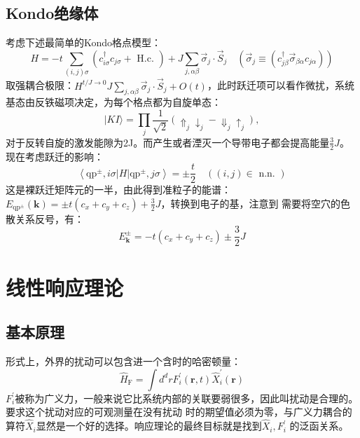 \documentclass[10pt,openany]{book}
\theoremstyle{thmstyle} %
\theoremstyle{defstyle} %
\theoremstyle{prostyle} %
\begin{document}
\subsection{Kondo绝缘体}
考虑下述最简单的Kondo格点模型：
\begin{equation}
	H=-t \sum_{(i, j) \sigma}\left(c_{i \sigma}^{\dagger} c_{j \sigma}+\text { H.c. }\right)+J \sum_{j, \alpha \beta} \vec{\sigma}_j \cdot \vec{S}_j \quad\left(\vec{\sigma}_j \equiv\left(c_{j \beta}^{\dagger} \vec{\sigma}_{\beta \alpha} c_{j \alpha}\right)\right)
\end{equation}
取强耦合极限：$ H^{t / J \rightarrow 0} J \sum_{j, \alpha \beta} \vec{\sigma}_j \cdot \vec{S}_j+O(t) $，此时跃迁项可以看作微扰，系统基态由反铁磁项决定，为每个格点都为自旋单态：
\begin{equation}
	|K I\rangle=\prod_j \frac{1}{\sqrt{2}}\left(\Uparrow_j \downarrow_j-\Downarrow_j \uparrow_j\right),
\end{equation} 
对于反转自旋的激发能隙为2J。而产生或者湮灭一个导带电子都会提高能量$ \frac{3}{2}J $。现在考虑跃迁的影响：
\begin{equation}
	\left\langle\mathrm{qp}^{ \pm}, i \sigma|H| \mathrm{qp}^{ \pm}, j \sigma\right\rangle= \pm \frac{t}{2} \quad((i, j) \in \text { n.n. })
\end{equation} 
这是裸跃迁矩阵元的一半，由此得到准粒子的能谱：$ E_{\mathrm{qp}^{ \pm}}(\mathbf{k})= \pm t\left(c_x+c_y+c_z\right)+\frac{3}{2} J $，转换到电子的基，注意到
需要将空穴的色散关系反号，有：
\begin{equation}
	E_{\mathbf{k}}^{ \pm}=-t\left(c_x+c_y+c_z\right) \pm \frac{3}{2} J
\end{equation} 
\section{线性响应理论}
\subsection{基本原理}
形式上，外界的扰动可以包含进一个含时的哈密顿量：
\begin{equation}
  \hat{H}_{\mathrm{F}}=\int d^d r F_i^{\prime}(\mathbf{r}, t) \hat{X}_i^{\prime}(\mathbf{r})
\end{equation}
$ F_i^{\prime} $被称为广义力，一般来说它比系统内部的关联要弱很多，因此叫扰动是合理的。要求这个扰动对应的可观测量在没有扰动
时的期望值必须为零，与广义力耦合的算符$ \hat{X}_i $显然是一个好的选择。响应理论的最终目标就是找到$ \hat{X}_i,F_i^{\prime} $
的泛函关系。\\
\end{document}

